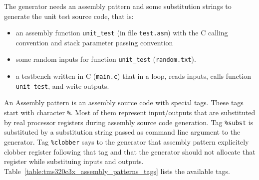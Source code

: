 The generator needs an assembly pattern and some substitution strings to generate the unit test source code, that is:
\begin{itemize}
\item an assembly function \texttt{unit\_test} (in file \texttt{test.asm}) with the C calling convention and stack parameter passing convention
\item some random inputs for function \texttt{unit\_test} (\texttt{random.txt}).
\item a testbench written in C (\texttt{main.c}) that in a loop, reads inputs, calls function \texttt{unit\_test}, and write outputs.
\end{itemize}

An Assembly pattern is an assembly source code with special tags. These tags start with character \texttt{\%}. Most of them represent input/outputs that are substituted by real processor registers during assembly source code generation. Tag \texttt{\%subst} is substituted by a substitution string passed as command line argument to the generator.
Tag \texttt{\%clobber} says to the generator that assembly pattern explicitely clobber register following that tag and that the generator should not allocate that register while substituing inputs and outputs.
Table~\ref{table:tms320c3x_assembly_patterns_tags} lists the available tags.

